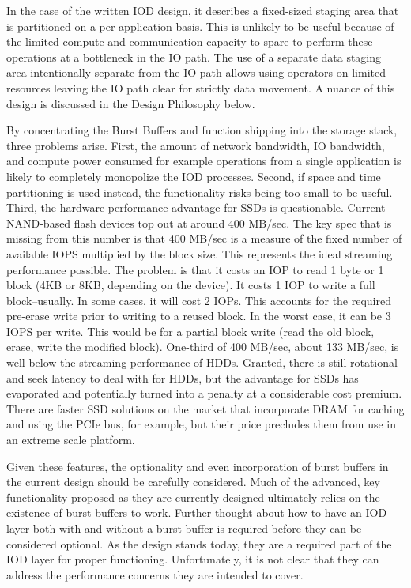 \documentclass[conference]{IEEEtran}
\begin{document}
In the case of the written IOD design, it describes a fixed-sized staging area
that is partitioned on a per-application basis.  This is unlikely to be useful
because of the limited compute and communication capacity to spare to perform
these operations at a bottleneck in the IO path.  The use of a separate data
staging area intentionally separate from the IO path allows using operators on
limited resources leaving the IO path clear for strictly data movement. A
nuance of this design is discussed in the Design Philosophy below.

By concentrating the Burst Buffers and function shipping into the storage
stack, three problems arise.  First, the amount of network bandwidth, IO
bandwidth, and compute power consumed for example operations from a single
application is likely to completely monopolize the IOD processes. Second, if
space and time partitioning is used instead, the functionality risks being too
small to be useful. Third, the hardware performance advantage for SSDs is
questionable. Current NAND-based flash devices top out at around 400 MB/sec.
The key spec that is missing from this number is that 400 MB/sec is a measure
of the fixed number of available IOPS multiplied by the block size. This
represents the ideal streaming performance possible. The problem is that it
costs an IOP to read 1 byte or 1 block (4KB or 8KB, depending on the device).
It costs 1 IOP to write a full block--usually. In some cases, it will cost 2
IOPs.  This accounts for the required pre-erase write prior to writing to a
reused block. In the worst case, it can be 3 IOPS per write. This would be for
a partial block write (read the old block, erase, write the modified block).
One-third of 400 MB/sec, about 133 MB/sec, is well below the streaming
performance of HDDs.  Granted, there is still rotational and seek latency to
deal with for HDDs, but the advantage for SSDs has evaporated and potentially
turned into a penalty at a considerable cost premium.  There are faster SSD
solutions on the market that incorporate DRAM for caching and using the PCIe
bus, for example, but their price precludes them from use in an extreme scale
platform.

Given these features, the optionality and even incorporation of burst buffers
in the current design should be carefully considered. Much of the advanced, key
functionality proposed as they are currently designed ultimately relies on the
existence of burst buffers to work. Further thought about how to have an IOD
layer both with and without a burst buffer is required before they can be
considered optional. As the design stands today, they are a required part of
the IOD layer for proper functioning. Unfortunately, it is not clear that they
can address the performance concerns they are intended to cover.
\end{document}
